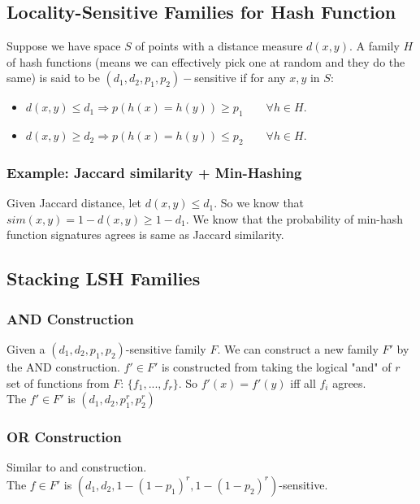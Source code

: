 \subsection{Locality-Sensitive Families for Hash Function}
Suppose we have space $S$ of points with a distance measure $d(x,y)$. A family $H$ of hash functions (means we can effectively pick one at random and they do the same) is said to be $(d_1, d_2, p_1, p_2)-$sensitive if for any $x,y$ in $S$: 
    \begin{itemize}
        \item $d(x,y) \leq d_1 \Longrightarrow p(h(x) = h(y))\geq p_1  \qquad \forall h\in H$. 
        \item $d(x,y) \geq d_2 \Longrightarrow p(h(x) = h(y))\leq p_2  \qquad \forall h\in H$. 
    \end{itemize}
    
\subsubsection{Example: Jaccard similarity + Min-Hashing} 
Given Jaccard distance, let $d(x,y) \leq d_1$. So we know that $sim(x,y) = 1 - d(x,y) \geq 1 - d_1$. We know that the probability of min-hash function signatures agrees is same as Jaccard similarity.  

\subsection{Stacking LSH Families} 
\subsubsection{AND Construction}
Given a $(d_1, d_2, p_1, p_2)$-sensitive family $F$. We can construct a new family $F'$ by the AND construction. $f'\in F'$ is constructed from
taking the logical "and" of $r$ set of functions from $F$:  $\{f_1, ..., f_r \}$. So $f'(x) = f'(y)$ iff all $f_i$ agrees. \\

The $f'\in F'$ is $(d_1, d_2, p_1^r, p_2^r)$ 


\subsubsection{OR Construction}
Similar to and construction. \\

The $f\in F'$ is $(d_1, d_2, 1 - (1-p_1)^r, 1-(1-p_2)^r)$-sensitive. 

